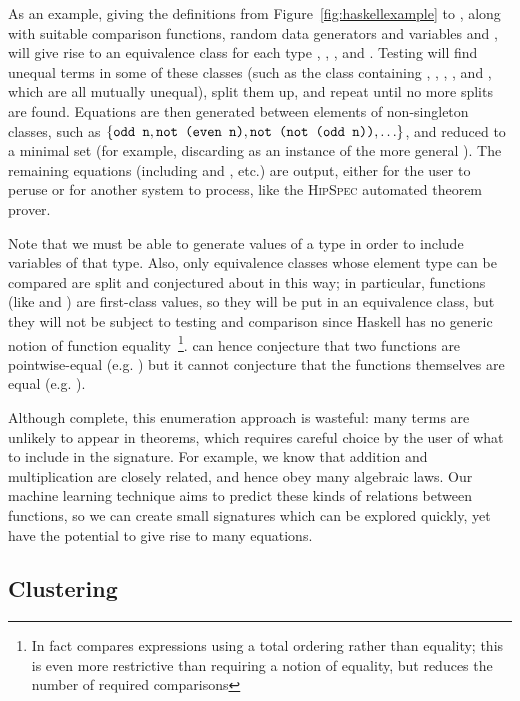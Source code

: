 As an example, giving the definitions from Figure~\ref{fig:haskellexample} to
\qspec{}, along with suitable comparison functions, random data generators and
variables  and , will give rise to an equivalence
class for each type , , ,  and
. Testing will find unequal terms in some of these classes
(such as the  class containing , , ,
,  and , which are all mutually unequal), split
them up, and repeat until no more splits are found. Equations are then generated
between elements of non-singleton classes, such as $\{\text{\texttt{odd n}},
\text{\texttt{not (even n)}}, \text{\texttt{not (not (odd n))}}, \ldots\}$, and reduced
to a minimal set (for example, discarding  as an
instance of the more general ). The remaining equations
(including  and , etc.) are
output, either for the user to peruse or for another system to process, like the
\textsc{HipSpec} automated theorem prover.

Note that we must be able to generate values of a type in order to include
variables of that type. Also, only equivalence classes whose element type can be
compared are split and conjectured about in this way; in particular, functions
(like  and ) are first-class values, so they will be put in an
equivalence class, but they will not be subject to testing and comparison since
Haskell has no generic notion of function equality~\footnote{In
  fact \qspec{} compares expressions using a total ordering rather than equality;
  this is even more restrictive than requiring a notion of equality, but reduces
  the number of required comparisons}. \qspec{} can hence conjecture that two
functions are pointwise-equal (e.g. ) but it cannot conjecture
that the functions themselves are equal (e.g. ).

Although complete, this enumeration approach is wasteful: many terms are
unlikely to appear in theorems, which requires careful choice by the user of
what to include in the signature. For example, we know that addition and
multiplication are closely related, and hence obey many algebraic laws. Our
machine learning technique aims to predict these kinds of relations between
functions, so we can create small signatures which can be explored quickly, yet
have the potential to give rise to many equations.

\subsection{Clustering}
\label{sec:clustering}

